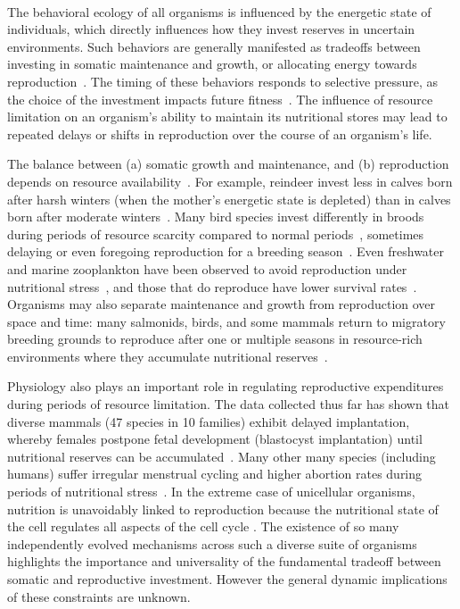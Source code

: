 \documentclass{pnastwo}
\begin{document}
\begin{article}
\vspace{2mm}

 \\ 
The behavioral ecology of all organisms is influenced by the energetic state of individuals, which directly influences how they invest reserves in uncertain environments.  
Such behaviors are generally manifested as tradeoffs between investing in somatic maintenance and growth, or allocating energy towards reproduction~\cite{Martin:1987dl,Kirk:1997cc,Kempes:2012hy}.  
The timing of these behaviors responds to selective pressure, as the choice of the investment impacts future fitness~\cite{Mangel:1988uaa,Mangel:2014kz,Yeakel:2013hi}.  
The influence of resource limitation on an organism's ability to maintain its nutritional stores may lead to repeated delays or shifts in reproduction over the course of an organism's life.

The balance between (a) somatic growth and maintenance, and (b) reproduction depends on resource availability~\cite{Morris:1987eo}.  
For example, reindeer invest less in calves born after harsh winters (when the mother's energetic state is depleted) than in calves born after moderate winters~\cite{Tveraa:2003fq}.  
Many bird species invest differently in broods during periods of resource scarcity compared to normal periods~\cite{Daan:1988va,Jacot:2009dv}, sometimes delaying or even foregoing reproduction for a breeding season~\cite{Martin:1987dl,Stearns:1989ip,Barboza:2002in}.  
Even freshwater and marine zooplankton have been observed to avoid reproduction under nutritional stress~\cite{Threlkeld:1976ih}, and those that do reproduce have lower survival rates~\cite{Kirk:1997cc}. 
Organisms may also separate maintenance and growth from reproduction over space and time: many salmonids, birds, and some mammals return to migratory breeding grounds to reproduce after one or multiple seasons in resource-rich environments where they accumulate nutritional reserves~\cite{Weber:1998jg,Mduma:1999cp,Moore:2014hi}.

Physiology also plays an important role in regulating reproductive expenditures during periods of resource limitation.  
The data collected thus far has shown that diverse mammals (47 species in 10 families) exhibit delayed implantation, whereby females postpone fetal development (blastocyst implantation) until nutritional reserves can be accumulated~\cite{Mead:1989dt,Sandell:1990kw}.  
Many other many species (including humans) suffer irregular menstrual cycling and higher abortion rates during periods of nutritional stress~\cite{Bulik:1999eo,Trites:2003cc}.  
In the extreme case of unicellular organisms, nutrition is unavoidably linked to reproduction because the nutritional state of the cell regulates all aspects of the cell cycle \cite{Glazier:2009hq}.  
The existence of so many independently evolved mechanisms across such a diverse suite of organisms highlights the importance and universality of the fundamental tradeoff between somatic and reproductive investment.  
However the general dynamic implications of these constraints are unknown.


\end{article}
\end{document}
